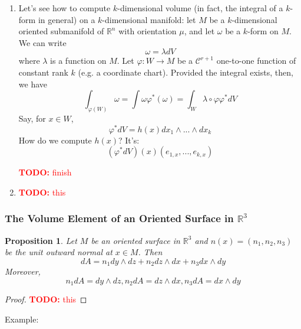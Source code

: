 \documentclass{article}
\newtheorem{proposition}{Proposition}
\newcommand{\reals}[0]{\mathbb{R}}
\newcommand{\mc}[1]{\mathcal{#1}}
\newcommand{\TODO}[1]{\textcolor{red}{\textbf{TODO:} #1}}
\begin{document}
\begin{enumerate}
  \item Let's see how to compute \(k\)-dimensional volume (in fact, the integral of a \(k\)-form in general) on a \(k\)-dimensional manifold: let \(M\) be a \(k\)-dimensional oriented submanifold of \(\reals^n\) with orientation \(\mu\), and let \(\omega\) be a \(k\)-form on \(M\). We can write
  \begin{equation}
    \omega = \lambda dV
  \end{equation}
  where \(\lambda\) is a function on \(M\). Let \(\varphi: W \to M\) be a \(\mc{C}^{r + 1}\) one-to-one function of constant rank \(k\) (e.g. a coordinate chart). Provided the integral exists, then, we have
  \begin{equation}
    \int_{\varphi(W)}\omega = \int\omega\varphi^*(\omega) = \int_W\lambda \circ \varphi\varphi^*dV
  \end{equation}
  Say, for \(x \in W\),
  \begin{equation}
    \varphi^*dV = h(x)dx_1 \wedge ... \wedge dx_k
  \end{equation}
  How do we compute \(h(x)\)? It's:
  \begin{equation}
    (\varphi^*dV)(x)(e_{1,x},...,e_{k,x})
  \end{equation}

  \TODO{finish}

  \item \TODO{this}

\end{enumerate}

\subsubsection{The Volume Element of an Oriented Surface in \(\reals^3\)}

\begin{proposition}
Let \(M\) be an oriented surface in \(\reals^3\) and \(n(x) = (n_1, n_2, n_3)\) be the unit outward normal at \(x \in M\). Then
\begin{equation}
  dA = n_1 dy \wedge dz + n_2 dz \wedge dx + n_3 dx \wedge dy
\end{equation}
Moreover,
\begin{equation}
  n_1dA = dy \wedge dz, n_2dA = dz \wedge dx, n_3dA = dx \wedge dy
\end{equation}
\end{proposition}
\begin{proof}
  \TODO{this}
\end{proof}
Example:
\end{document}
